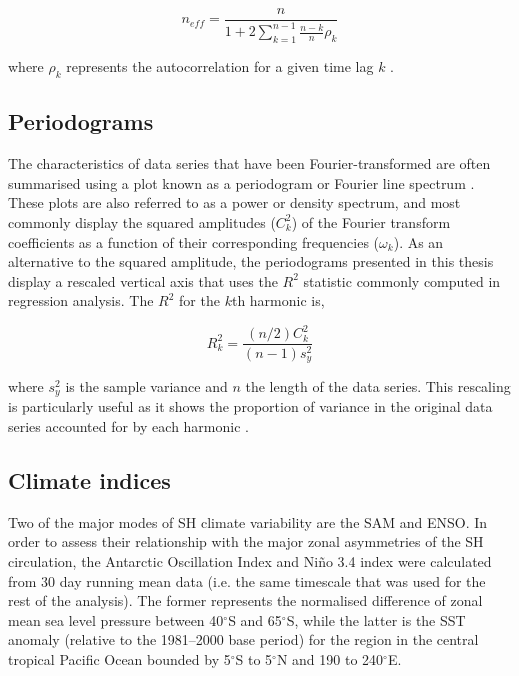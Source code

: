 \begin{equation}\label{eq:effective_sample_size}
n_{eff} = \frac{n}{1 + 2\displaystyle\sum_{k=1}^{n-1} \frac{n-k}{n}\rho_k}
\end{equation}

\noindent where $\rho_k$ represents the autocorrelation for a given time lag $k$ \citep{Zieba2010}.  

\subsection{Periodograms}
The characteristics of data series that have been Fourier-transformed are often summarised using a plot known as a periodogram or Fourier line spectrum \citep{Wilks2011}. These plots are also referred to as a power or density spectrum, and most commonly display the squared amplitudes ($C_k^2$) of the Fourier transform coefficients as a function of their corresponding frequencies ($\omega_k$). As an alternative to the squared amplitude, the periodograms presented in this thesis display a rescaled vertical axis that uses the $R^2$ statistic commonly computed in regression analysis. The $R^2$ for the $k$th harmonic is,

\begin{equation}\label{eq:variance_explained}
R_k^2 = \frac{(n/2)C_k^2}{(n-1)s_y^2}
\end{equation}

\noindent where $s_y^2$ is the sample variance and $n$ the length of the data series. This rescaling is particularly useful as it shows the proportion of variance in the original data series accounted for by each harmonic \citep{Wilks2011}.

\subsection{Climate indices}
Two of the major modes of SH climate variability are the SAM and ENSO. In order to assess their relationship with the major zonal asymmetries of the SH circulation, the Antarctic Oscillation Index \citep[AOI;][]{Gong1999} and Ni\~{n}o 3.4 index \citep{Trenberth2001} were calculated from 30 day running mean data (i.e. the same timescale that was used for the rest of the analysis). The former represents the normalised difference of zonal mean sea level pressure between 40$^{\circ}$S and 65$^{\circ}$S, while the latter is the SST anomaly (relative to the 1981--2000 base period) for the region in the central tropical Pacific Ocean bounded by 5$^{\circ}$S to 5$^{\circ}$N and 190 to 240$^{\circ}$E. 



